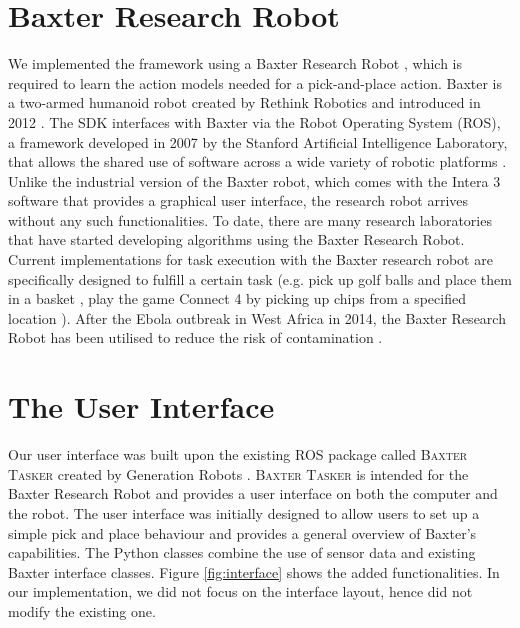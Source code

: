 
\section{Baxter Research Robot}
We implemented the framework using a Baxter Research Robot \cite{robotics2013baxter}, which is required to learn the action models needed for a pick-and-place action.
Baxter is a two-armed humanoid robot created by Rethink Robotics and introduced in 2012 \cite{robotics2013baxter}. The SDK interfaces with Baxter via the Robot Operating System (ROS), a framework developed in 2007 by the Stanford Artificial Intelligence Laboratory, that allows the shared use of software across a wide variety of robotic platforms \cite{fernandez2015learning}. Unlike the industrial version of the Baxter robot, which comes with the Intera 3 software that provides a graphical user interface, the research robot arrives without any such functionalities. 
To date, there are many research laboratories that have started developing algorithms using the Baxter Research Robot. Current implementations for task execution with the Baxter research robot are specifically designed to fulfill a certain task (e.g. pick up golf balls and place them in a basket \cite{BaxterGolf}, play the game Connect 4 by picking up chips from a specified location \cite{Connect4}). After the Ebola outbreak in West Africa in 2014, the Baxter Research Robot has been utilised to reduce the risk of contamination \cite{Ebola}. 
\section{The User Interface}
Our user interface was built upon the existing ROS package called \textsc{Baxter Tasker} created by Generation Robots \cite{BaxterTasker}. \textsc{Baxter Tasker} is intended for the Baxter Research Robot and provides a user interface on both the computer and the robot. The user interface was initially designed to allow users to set up a simple pick and place behaviour and provides a general overview of Baxter's capabilities. The Python classes combine the use of sensor data and existing Baxter interface classes. Figure \ref{fig:interface} shows the added functionalities. In our implementation, we did not focus on the interface layout, hence did not modify the existing one.

